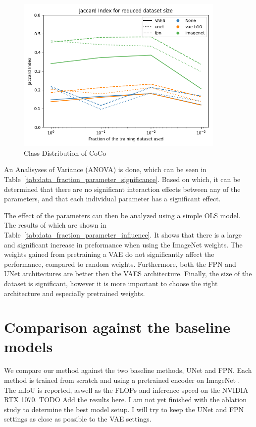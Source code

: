 \begin{figure}[h]
    \centering
    \includegraphics[width=0.9\textwidth]{figures/data_percentage/line-plot.png}
    \caption{Class Distribution of CoCo}
    \label{fig:dataset-fraction-results}
\end{figure}

An Analisyses of Variance (ANOVA) is done, which can be seen in Table~\ref{tab:data_fraction_parameter_significance}. Based on which, it can be determined that there are no significant interaction effects between any of the parameters, and that each individual parameter has a significant effect.


The effect of the parameters can then be analyzed using a simple OLS model. The results of which are shown in Table~\ref{tab:data_fraction_parameter_influence}. It shows that there is a large and significant increase in preformance when using the ImageNet weights. The weights gained from pretraining a VAE do not significantly affect the performance, compared to random weights. Furthermore, both the FPN and UNet architectures are better then the VAES architecture. Finally, the size of the dataset is significant, however it is more important to choose the right architecture and especially pretrained weights.




\section{Comparison against the baseline models}
We compare our method against the two baseline methods, UNet and FPN. Each method is trained from scratch and using a pretrained encoder on ImageNet \cite{deng2009imagenet}. The mIoU is reported, aswell as the FLOPs and inference speed on the NVIDIA RTX 1070. 
TODO Add the results here. I am not yet finished with the ablation study to determine the best model setup. I will try to keep the UNet and FPN settings as close as possible to the VAE settings.

